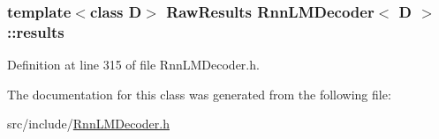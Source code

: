 \subsubsection[{results}]{\setlength{\rightskip}{0pt plus 5cm}template$<$class D$>$ {\bf Raw\+Results} {\bf Rnn\+L\+M\+Decoder}$<$ D $>$\+::results}\hypertarget{class_rnn_l_m_decoder_a1f394450c2b0322b37e19bfb94a9f8b0}{}\label{class_rnn_l_m_decoder_a1f394450c2b0322b37e19bfb94a9f8b0}


Definition at line 315 of file Rnn\+L\+M\+Decoder.\+h.



The documentation for this class was generated from the following file\+:\begin{DoxyCompactItemize}
\item 
src/include/\hyperlink{_rnn_l_m_decoder_8h}{Rnn\+L\+M\+Decoder.\+h}\end{DoxyCompactItemize}
